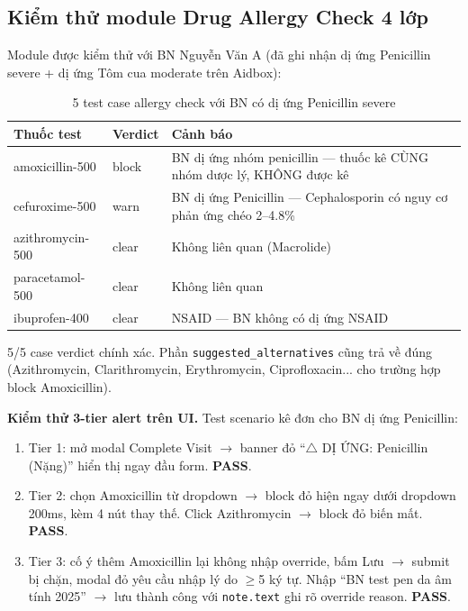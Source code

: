 \documentclass[a4paper,13pt,3p,oneside]{report}
\theoremstyle{definition}
\theoremstyle{remark}
\theoremstyle{definition}
\begin{document}
\subsection{Kiểm thử module Drug Allergy Check 4 lớp}

Module được kiểm thử với BN Nguyễn Văn A (đã ghi nhận dị ứng Penicillin severe + dị ứng Tôm cua moderate trên Aidbox):

\begin{table}[H]
\centering
\begin{tabular}{|p{3.5cm}|p{2cm}|p{8cm}|}
\hline
\textbf{Thuốc test} & \textbf{Verdict} & \textbf{Cảnh báo} \\
\hline
amoxicillin-500 & block & BN dị ứng nhóm penicillin --- thuốc kê CÙNG nhóm dược lý, KHÔNG được kê \\
\hline
cefuroxime-500 & warn & BN dị ứng Penicillin --- Cephalosporin có nguy cơ phản ứng chéo 2--4.8\% \\
\hline
azithromycin-500 & clear & Không liên quan (Macrolide) \\
\hline
paracetamol-500 & clear & Không liên quan \\
\hline
ibuprofen-400 & clear & NSAID --- BN không có dị ứng NSAID \\
\hline
\end{tabular}
\caption{5 test case allergy check với BN có dị ứng Penicillin severe}
\label{tab:allergy-test}
\end{table}

5/5 case verdict chính xác. Phần \texttt{suggested\_alternatives} cũng trả về đúng (Azithromycin, Clarithromycin, Erythromycin, Ciprofloxacin... cho trường hợp block Amoxicillin).

\textbf{Kiểm thử 3-tier alert trên UI.} Test scenario kê đơn cho BN dị ứng Penicillin:
\begin{enumerate}
  \item Tier 1: mở modal Complete Visit $\to$ banner đỏ ``$\triangle$ DỊ ỨNG: Penicillin (Nặng)'' hiển thị ngay đầu form. \textbf{PASS}.
  \item Tier 2: chọn Amoxicillin từ dropdown $\to$ block đỏ hiện ngay dưới dropdown 200ms, kèm 4 nút thay thế. Click Azithromycin $\to$ block đỏ biến mất. \textbf{PASS}.
  \item Tier 3: cố ý thêm Amoxicillin lại không nhập override, bấm Lưu $\to$ submit bị chặn, modal đỏ yêu cầu nhập lý do $\geq$5 ký tự. Nhập ``BN test pen da âm tính 2025'' $\to$ lưu thành công với \texttt{note.text} ghi rõ override reason. \textbf{PASS}.
\end{enumerate}
\end{document}
